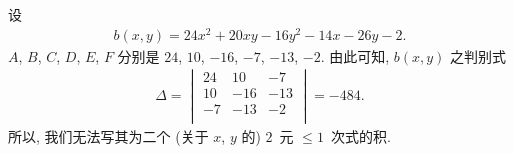\documentclass[%
    UTF8,%
    fontset=none,%
    punct=kaiming,%
    zihao=-4,%
    a4paper,%
    oneside,%
]{ctexbook}
\renewcommand*{\leq}{\leqslant}
\begin{document}
\begin{example}
    设
    \begin{align*}
        b(x, y) = 24x^2 + 20xy - 16y^2 - 14x - 26y - 2.
    \end{align*}
    \(A\), \(B\), \(C\), \(D\), \(E\), \(F\)
    分别是
    \(24\), \(10\), \(-16\), \(-7\), \(-13\), \(-2\).
    由此可知, \(b(x, y)\) 之判别式
    \begin{align*}
        \Delta
        = \begin{vmatrix}
              24 & 10  & -7  \\
              10 & -16 & -13 \\
              -7 & -13 & -2  \\
          \end{vmatrix}
        = -484.
    \end{align*}
    所以, 我们无法写其为二个
    (关于 \(x\), \(y\) 的)
    \(2\)~元 \({\leq} 1\)~次式的积.
\end{example}
\end{document}
